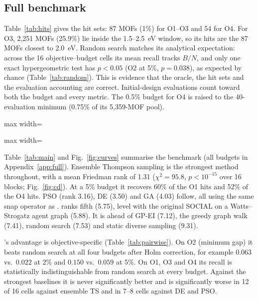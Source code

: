 \subsection{Full benchmark}
\label{sec:res-main}
Table~\ref{tab:hits} gives the hit sets: 87 MOFs (1\%) for O1--O3 and 54 for O4. For O3, 2{,}251 MOFs (25.9\%) lie inside the 1.5--2.5~eV window, so its hits are the 87 MOFs closest to 2.0~eV. Random search matches its analytical expectation: across the 16 objective--budget cells its mean recall tracks $B/N$, and only one exact hypergeometric test has $p<0.05$ (O2 at 5\%, $p=0.038$), as expected by chance (Table~\ref{tab:random}). This is evidence that the oracle, the hit sets and the evaluation accounting are correct. Initial-design evaluations count toward both the budget and every metric. The 0.5\% budget for O4 is raised to the 40-evaluation minimum (0.75\% of its 5{,}359-MOF pool).

\begin{table}[t]
\centering
\caption{Hit sets (top 1\% of each objective's pool).}
\label{tab:hits}
\scriptsize
\begin{adjustbox}{max width=\textwidth}\end{adjustbox}
\end{table}

\begin{table}[t]
\centering
\caption{Random search against its analytical expectation ($E[\text{recall}]=B/N$; exact two-sided test on the hit total over 30 seeds).}
\label{tab:random}
\scriptsize
\begin{adjustbox}{max width=\textwidth}\end{adjustbox}
\end{table}

Table~\ref{tab:main} and Fig.~\ref{fig:curves} summarise the benchmark (all budgets in Appendix~\ref{app:full}). Ensemble Thompson sampling is the strongest method throughout, with a mean Friedman rank of 1.31 ($\chi^2=95.8$, $p<10^{-15}$ over 16 blocks; Fig.~\ref{fig:cd}). At a 5\% budget it recovers 60\% of the O1 hits and 52\% of the O4 hits. PSO (rank 3.16), DE (3.50) and GA (4.03) follow, all using the same snap operator as \gs{}. \gs{} ranks fifth (5.75), level with the original SOCIAL on a Watts--Strogatz agent graph (5.88). It is ahead of GP-EI (7.12), the greedy graph walk (7.41), random search (7.53) and static diverse sampling (9.31).

\gs{}'s advantage is objective-specific (Table~\ref{tab:pairwise}). On O2 (minimum gap) it beats random search at all four budgets after Holm correction, for example $0.063$ vs.\ $0.022$ at 2\% and $0.150$ vs.\ $0.059$ at 5\%. On O1, O3 and O4 its recall is statistically indistinguishable from random search at every budget. Against the strongest baselines it is never significantly better and is significantly worse in 12 of 16 cells against ensemble TS and in 7--8 cells against DE and PSO.

